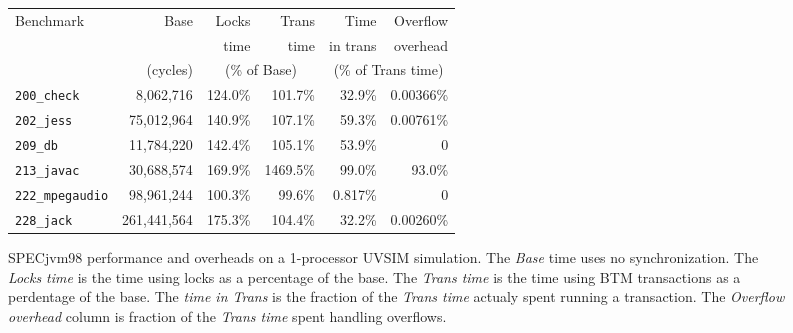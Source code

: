 \documentclass[preprint]{rdbacmconf}
\begin{document}
\begin{figure*}
\footnotesize
\begin{center}
\begin{tabular}{lr|rr|rr}
Benchmark                 &  Base       & Locks         & Trans              & Time                     & Overflow       \\
                          &             & time          & time               & in trans              & overhead       \\
                          &  (cycles)   & \multicolumn{2}{c|}{(\% of Base)}   & \multicolumn{2}{c}{(\% of Trans time)}                 \\ \hline
\texttt{200\_check}       &   8,062,716 & 124.0\%       &  101.7\%           & 32.9\%           & 0.00366\%      \\
\texttt{202\_jess}        &  75,012,964 & 140.9\%       &  107.1\%           & 59.3\%           & 0.00761\%      \\
\texttt{209\_db}          &  11,784,220 & 142.4\%       &  105.1\%           & 53.9\%           & 0              \\
\texttt{213\_javac}       &  30,688,574 & 169.9\%       & 1469.5\%           & 99.0\%           & 93.0\%         \\
\texttt{222\_mpegaudio}&  98,961,244    & 100.3\%       &   99.6\%           & 0.817\%          & 0              \\
\texttt{228\_jack}        & 261,441,564 & 175.3\%       &  104.4\%           & 32.2\%           & 0.00260\%      \\
\end{tabular}
\end{center}
\caption{SPECjvm98 performance and overheads on a 1-processor UVSIM simulation. The {\em Base }
 time uses no synchronization.  The {\em Locks time} is the time using
 locks as a percentage of the base.  The {\em Trans time} is the time using BTM
 transactions as a perdentage of the base. The
 {\em time in Trans} is the fraction of the {\em Trans time} actualy
 spent running a transaction.  The {\em
 Overflow overhead} column is fraction of the {\em Trans time}
 spent handling overflows.}
\label{fig:specperf}
\end{figure*}
\end{document}
